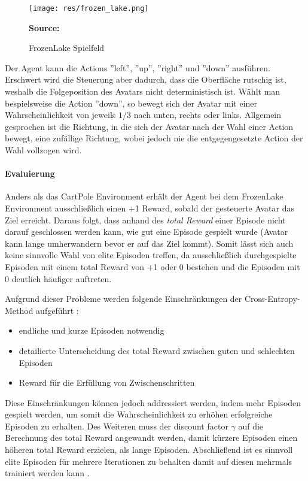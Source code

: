 \documentclass[11pt]{scrartcl}
\newcommand{\source}[1]{\vspace{-5pt} \caption*{\hfill \textbf{Source:} {#1}} }
\begin{document}
\begin{figure}[htp]
\centering
\texttt{[image: res/frozen\_lake.png]}
\caption{FrozenLake Spielfeld}
\source{\cite[~S.90 - Chapter 4 - Figure 5]{L2018}}
\label{fig:frozen_lake}
\end{figure}

\noindent
Der Agent kann die Actions ''left'', ''up'', ''right'' und ''down'' ausführen.
Erschwert wird die Steuerung aber dadurch, dass die Oberfläche rutschig ist, weshalb
die Folgeposition des Avatars nicht deterministisch ist. Wählt man bespielsweise die
Action ''down'', so bewegt sich der Avatar mit einer Wahrscheinlichkeit von jeweils
$1/3$ nach unten, rechts oder links. Allgemein gesprochen ist die Richtung, in die
sich der Avatar nach der Wahl einer Action bewegt, eine zufällige Richtung, wobei
jedoch nie die entgegengesetzte Action der Wahl vollzogen wird.


\paragraph*{Evaluierung}
\label{sec:cross_entropy_results}
\noindent
\newline
Anders als das CartPole Environment erhält der Agent bei dem FrozenLake Environment 
ausschließlich einen +1 Reward, sobald der gesteuerte Avatar das Ziel erreicht. Daraus folgt,
dass anhand des \textit{total Reward} einer Episode nicht darauf geschlossen werden kann,
wie gut eine Episode gespielt wurde (Avatar kann lange umherwandern bevor er auf das Ziel kommt).
Somit lässt sich auch keine sinnvolle Wahl von elite Episoden treffen, da ausschließlich
durchgespielte Episoden mit einem total Reward von +1 oder 0 bestehen und die Episoden mit 0
deutlich häufiger auftreten.

Aufgrund dieser Probleme werden folgende Einschränkungen der Cross-Entropy-Method 
aufgeführt \cite[~S.92 f.]{L2018}:
\begin{itemize}
\itemsep0pt
\item endliche und kurze Episoden notwendig
\item detailierte Unterscheidung des total Reward zwischen guten und schlechten Episoden
\item Reward für die Erfüllung von Zwischenschritten
  \label{itm:cross_entropy_limits}
\end{itemize}

Diese Einschränkungen können jedoch addressiert werden, indem mehr Episoden gespielt werden, 
um somit die Wahrscheinlichkeit zu erhöhen erfolgreiche Episoden zu erhalten. Des Weiteren
muss der discount factor $\gamma$ auf die Berechnung des total Reward angewandt werden, damit
kürzere Episoden einen höheren total Reward erzielen, als lange Episoden. Abschließend ist es
sinnvoll elite Episoden für mehrere Iterationen zu behalten damit auf diesen mehrmals
trainiert werden kann \cite[~S.93]{L2018}.  
\end{document}
